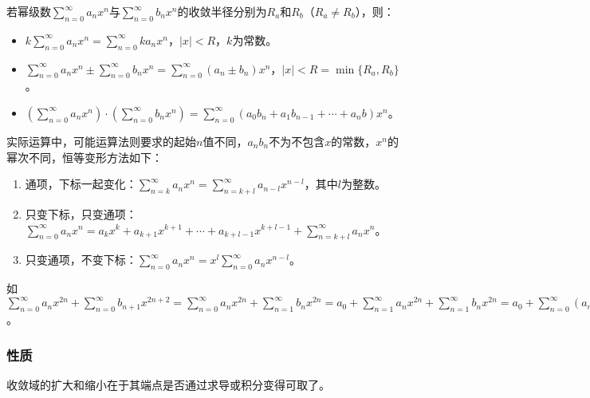 \documentclass[UTF8, 12pt]{ctexart}
\begin{document}
若幂级数$\sum\limits_{n=0}^\infty a_nx^n$与$\sum\limits_{n=0}^\infty b_nx^n$的收敛半径分别为$R_a$和$R_b$（$R_a\neq R_b$），则：

\begin{itemize}
    \item $k\sum\limits_{n=0}^\infty a_nx^n=\sum\limits_{n=0}^\infty ka_nx^n$，$\vert x\vert<R$，$k$为常数。
    \item $\sum\limits_{n=0}^\infty a_nx^n\pm\sum\limits_{n=0}^\infty b_nx^n=\sum\limits_{n=0}^\infty (a_n\pm b_n)x^n$，$\vert x\vert<R=\min\{R_a,R_b\}$。
    \item $(\sum\limits_{n=0}^\infty a_nx^n)\cdot(\sum\limits_{n=0}^\infty b_nx^n)=\sum\limits_{n=0}^\infty(a_0b_n+a_1b_{n-1}+\cdots+a_nb)x^n$。
\end{itemize}

实际运算中，可能运算法则要求的起始$n$值不同，$a_nb_n$不为不包含$x$的常数，$x^n$的幂次不同，恒等变形方法如下：

\begin{enumerate}
    \item 通项，下标一起变化：$\sum\limits_{n=k}^\infty a_nx^n=\sum\limits_{n=k+l}^\infty a_{n-l}x^{n-l}$，其中$l$为整数。
    \item 只变下标，只变通项：$\sum\limits_{n=0}^\infty a_nx^n=a_kx^k+a_{k+1}x^{k+1}+\cdots+a_{k+l-1}x^{k+l-1}+\sum\limits_{n=k+l}^\infty a_nx^n$。
    \item 只变通项，不变下标：$\sum\limits_{n=0}^\infty a_nx^n=x^l\sum\limits_{n=0}^\infty a_nx^{n-l}$。
\end{enumerate}

如$\sum\limits_{n=0}^\infty a_nx^{2n}+\sum\limits_{n=0}^\infty b_{n+1}x^{2n+2}=\sum\limits_{n=0}^\infty a_nx^{2n}+\sum\limits_{n=1}^\infty b_nx^{2n}=a_0+\sum\limits_{n=1}^\infty a_nx^{2n}+\sum\limits_{n=1}^\infty b_nx^{2n}=a_0+\sum\limits_{n=0}^\infty(a_n+b_n)x^{2n}$。

\subsubsection{性质}

收敛域的扩大和缩小在于其端点是否通过求导或积分变得可取了。
\end{document}
